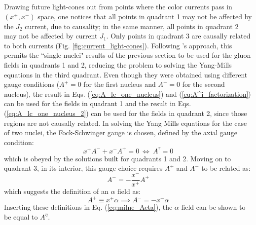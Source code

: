 Drawing future light-cones out from points where the color currents pass in $(x^+,x^-)$ space, one notices that all points in quadrant 1 may not be affected by the $J_2$ current, due to causality; in the same manner, all points in quadrant 2 may not be affected by current $J_1$. Only points in quadrant 3 are causally related to both currents (Fig. \ref{fig:current_light-cones}). Following \cite{Albacete_2019}'s approach, this permits the ``single-nuclei" results of the previous section to be used for the gluon fields in quadrants 1 and 2, reducing the problem to solving the Yang-Mills equations in the third quadrant. Even though they were obtained using different gauge conditions ($A^+ = 0$ for the first nucleus and $A^- = 0$ for the second nucleus), the result in Eqs. (\ref{eq:A_lc_one_nucleus}) and (\ref{eq:A^i_factorization}) can be used for the fields in quadrant 1 and the result in Eqs. (\ref{eq:A_lc_one_nucleus_2}) can be used for the fields in quadrant 2, since those regions are not causally related. In solving the Yang Mills equations for the case of two nuclei, the Fock-Schwinger gauge is chosen, defined by the axial gauge condition:
\begin{equation}
	x^+ A^- + x^- A^+ = 0 ~ \Leftrightarrow ~ A^\tau = 0
\end{equation}
which is obeyed by the solutions built for quadrants 1 and 2. Moving on to quadrant 3, in its interior, this gauge choice requires $A^+$ and $A^-$ to be related as:
\begin{equation}
	A^- = -\frac{x^-}{x^+} A^+ 
\end{equation}
which suggests the definition of an $\alpha$ field as:
\begin{equation}
	A^+ \equiv x^+ \alpha \implies A^- = - x^- \alpha
\end{equation}
Inserting these definitions in Eq. (\ref{eq:milne_Aeta}), the $\alpha$ field can be shown to be equal to $A^\eta$.

